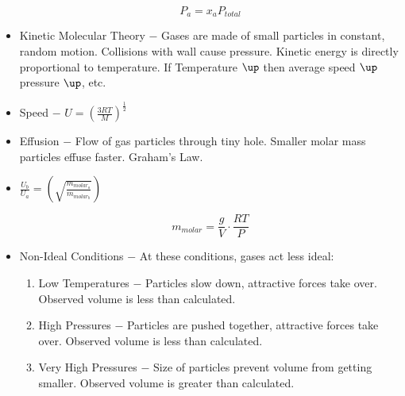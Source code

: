\documentclass[12pt]{article}
\begin{document}
\begin{itemize}
    \begin{equation}
      P_a=x_aP_{total}
      \label{2}
    \end{equation}
    

  \item Kinetic Molecular Theory $-$ Gases are made of small particles in constant, random motion. Collisions with wall cause pressure. Kinetic energy is directly proportional to temperature. If Temperature $\up$ then average speed $\up$ pressure $\up$, etc.

  \item Speed $-$ $U=\left( \frac{3RT}{M} \right)^{\frac{1}{2}}$

  \item Effusion $-$ Flow of gas particles through tiny hole. Smaller molar mass particles effuse faster. Graham's Law.

  \item $\frac{U_b}{U_a}=\left( \sqrt{\frac{m_{molar_a}}{m_{molar_b}}} \right)$

    \begin{equation}
      m_{molar}=\frac{g}{V}\cdot\frac{RT}{P}
      \label{3}
    \end{equation}

  \item Non-Ideal Conditions $-$ At these conditions, gases act less ideal:

    \begin{enumerate}

      \item Low Temperatures $-$ Particles slow down, attractive forces take over. Observed volume is less than calculated.

      \item High Pressures $-$ Particles are pushed together, attractive forces take over. Observed volume is less than calculated.

      \item Very High Pressures $-$ Size of particles prevent volume from getting smaller. Observed volume is greater than calculated.

    \end{enumerate}

\end{itemize}
\end{document}
